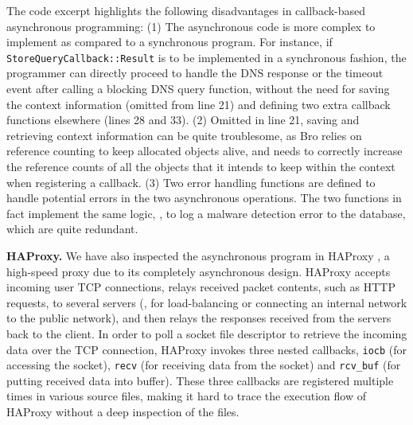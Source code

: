 The code excerpt highlights the following disadvantages in callback-based asynchronous programming:
(1) The asynchronous code is more complex to implement as compared to a synchronous program. For instance, if \lstinline[style=InlineStyle]{StoreQueryCallback::Result} is to be implemented in a synchronous fashion, the programmer can directly proceed to handle the DNS response or the timeout event after calling a blocking DNS query function, without the need for saving the context information (omitted from line 21) and defining two extra callback functions elsewhere (lines 28 and 33). %
(2) Omitted in line 21, saving and retrieving context information can be quite troublesome, as Bro relies on reference counting to keep allocated objects alive, and needs to correctly increase the reference counts of all the objects that it intends to keep within the context when registering a callback.
(3) Two error handling functions are defined to handle potential errors in the two asynchronous operations. The two functions in fact implement the same logic, \ie, to log a malware detection error to the database, which are quite redundant.





\noindent\textbf{HAProxy.}
 We have also inspected the asynchronous program in HAProxy \cite{haproxy}, a high-speed proxy due to its completely asynchronous design. HAProxy accepts incoming user TCP connections, relays received packet contents, such as HTTP requests, to several servers (\eg, for load-balancing or connecting an internal network to the public network), and then relays the responses received from the servers back to the client.
 In order to poll a socket file descriptor to retrieve the incoming data over the TCP connection, HAProxy invokes three nested callbacks, \lstinline[style=InlineStyle]{iocb} (for accessing the socket), \lstinline[style=InlineStyle]{recv} (for receiving data from the socket) and \lstinline[style=InlineStyle]{rcv_buf} (for putting received data into buffer). These three callbacks are registered multiple times in various source files, making it hard to trace the execution flow of HAProxy without a deep inspection of the files.

